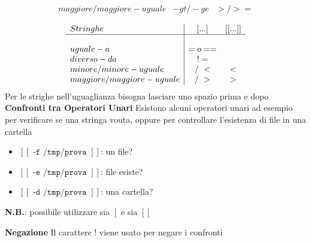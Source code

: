 \begin{flushleft}
$$\begin{array}{l|c|c}
    maggiore/maggiore-uguale & -gt / -ge & > / >= \\
  \end{array}$$
  $$\begin{array}{l|cc}
    Stringhe & [...] & [[...]] \\
    \hline & \\
    uguale-a & = o == \\
    diverso-da &   != \\
    minore/minore-uguale & /\ < & <  \\
    maggiore/maggiore-uguale & /\ > & >  \\
  \end{array}$$
  Per le strighe nell'uguaglianza bisogna lasciare uno spazio prima e dopo
  \textbf{Confronti tra Operatori Unari}
  Esistono alcuni operatori unari ad esempio per verificare se una stringa \ace 
  vouta, oppure per controllare l'esistenza di file in una cartella
  \begin{itemize}
    \item $[[\texttt{ -f /tmp/prova }]]$: \ace un file?
    \item $[[\texttt{ -e /tmp/prova }]]$: file esiste?
    \item $[[\texttt{ -d /tmp/prova }]]$: \ace una cartella?
  \end{itemize}
  \textbf{N.B.}: \ace possibile utilizzare sia $\left[\right.$ e sia $\left[\left[\right.\right.$\par
  \textbf{Negazione}
  Il carattere ! viene usato per negare i confronti
\end{flushleft}
